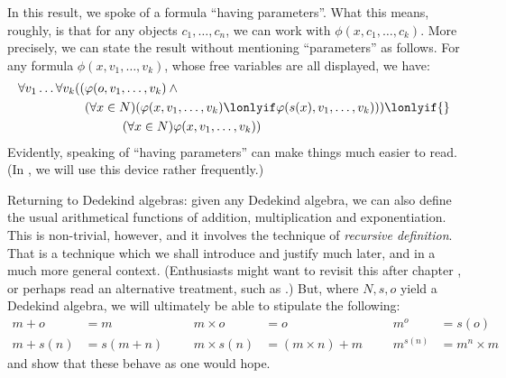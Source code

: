 \documentclass[../../../include/open-logic-section]{subfiles}
\begin{document}
In this result, we spoke of a formula ``having parameters''. What this
means, roughly, is that for any objects $c_1, \ldots, c_n$, we can
work with $\phi(x, c_1, \ldots, c_k)$. More precisely, we can state
the result without mentioning ``parameters'' as follows. For any
formula $\phi(x, v_1, \ldots, v_k)$, whose free variables are all
displayed, we have:
	\begin{align*}
			\forall v_1 \ldots \forall v_k((&\phi(o, v_1,\ldots, v_k) \land {}\\
			&	(\forall x \in N)(\phi(x,v_1, \ldots, v_k) \lonlyif \phi(s(x), v_1,\ldots, v_k))) \lonlyif {}\\
			&\hspace{3em} (\forall x \in N)\phi(x, v_1,\ldots, v_k))
	\end{align*}
Evidently, speaking of ``having parameters'' can make things much
easier to read. (In , we will use this device
rather frequently.)

Returning to Dedekind algebras: given any Dedekind algebra, we can
also define the usual arithmetical functions of addition,
multiplication and exponentiation. This is non-trivial, however, and
it involves the technique of \emph{recursive definition}. That is a
technique which we shall introduce and justify much later, and in a
much more general context. (Enthusiasts might want to revisit this
after chapter , or perhaps read an alternative
treatment, such as \cite[pp.~95--8]{Potter2004}.) But, where $N, s, o$
yield a Dedekind algebra, we will ultimately be able to stipulate the
following:
\begin{align*}
	{m} + {o} &= {m} & & & {m} \times {o} &= {o} & & & {m}^{o} &= s(o)\\
{m} + {s}({n}) &= {s}({m}+{n}) &&& {m} \times {s}({n}) &= ({m}\times {n}) + {m}  & & & {m}^{{s}({n})} &= {m}^{n} \times {m}
\end{align*}
and show that these behave as one would hope.
\end{document}

